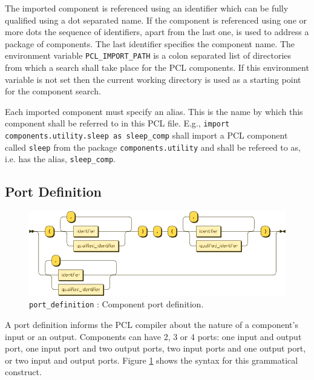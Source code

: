 The imported component is referenced using an identifier which can be fully qualified using a dot separated name. If the component is referenced using one or more dots the sequence of identifiers, apart from the last one, is used to address a package of components. The last identifier specifies the component name. The environment variable \texttt{PCL\_IMPORT\_PATH} is a colon separated list of directories from which a search shall take place for the PCL components. If this environment variable is not set then the current working directory is used as a starting point for the component search.

Each imported component must specify an alias. This is the name by which this component shall be referred to in this PCL file. E.g., \texttt{import components.utility.sleep as sleep\_comp} shall import a PCL component called \texttt{sleep} from the package \texttt{components.utility} and shall be refereed to as, i.e. has the alias, \texttt{sleep\_comp}.

\subsection{Port Definition}\label{subsec:port-def}
\begin{figure}[h!]
  \centering
    \includegraphics[scale=\DiagramScale,angle=90]{chapters/compiler/diagrams/port_definition}
  \caption{\texttt{port\_definition} : Component port definition.}
  \label{fig:pcl-port-def}
\end{figure}
A port definition informs the PCL compiler about the nature of a component's input or an output. Components can have 2, 3 or 4 ports: one input and output port, one input port and two output ports, two input ports and one output port, or two input and output ports. Figure \ref{fig:pcl-port-def} shows the syntax for this grammatical construct.

